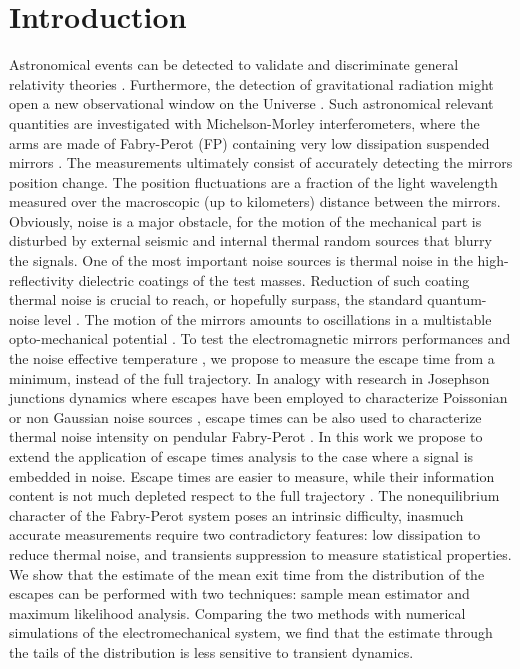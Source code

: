 \documentclass[conference]{IEEEtran}
\begin{document}
\section{Introduction}
Astronomical events can be detected to validate and discriminate general relativity theories \cite{Deruelle84,Drever83}. Furthermore, the detection of gravitational radiation might open a new observational window on the Universe \cite{InterfeWeb}. Such astronomical relevant  quantities are investigated with Michelson-Morley interferometers, where the arms are made of Fabry-Perot (FP) containing very low dissipation suspended mirrors \cite{Rakhmanov98}. 
The measurements ultimately consist of accurately detecting the mirrors position change. 
The position fluctuations are a fraction of the light wavelength measured over the macroscopic (up to kilometers) distance between the mirrors. 
Obviously, noise is a major obstacle, for the motion of the mechanical part is disturbed by external seismic and internal thermal random sources that blurry the signals.
One of the most important noise sources is thermal noise in the high-reflectivity dielectric coatings of the test masses.
Reduction of  such coating thermal noise is crucial to reach, or hopefully surpass, the standard quantum-noise level \cite{Principe15}.
The motion of the mirrors amounts to oscillations in a multistable opto-mechanical potential \cite{Aguirregabiria87,Pierro94}. 
To test the electromagnetic mirrors performances  and the noise effective temperature \cite{Villar10,Bodiya12}, we propose to measure the escape time from a minimum, instead of the full trajectory. 
In analogy with research in Josephson junctions dynamics \cite{Marchesoni97} where escapes have been employed to characterize Poissonian \cite{Pekola04} or non Gaussian noise sources \cite{Valenti14}, escape times can be also used to characterize thermal noise intensity on pendular Fabry-Perot \cite{Addesso15}. 
In this work we propose to extend the application of escape times analysis to the case where a signal is embedded in noise.
Escape times are easier to measure, while their information content is not much depleted respect to the full trajectory \cite{Addesso13}. 
The nonequilibrium character of the Fabry-Perot system poses an intrinsic difficulty, inasmuch accurate measurements require two contradictory features: low dissipation to reduce thermal noise, and transients suppression to measure statistical properties. 
We show that the estimate of the mean exit time from the distribution of the escapes can be performed with two techniques: sample mean estimator and maximum likelihood analysis. Comparing the two methods with numerical simulations of the electromechanical system, we find that the estimate through the tails of the distribution is less sensitive to transient dynamics. 
\end{document}
